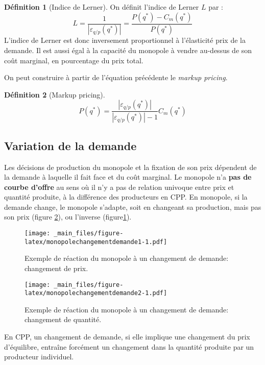 \documentclass[
  a4paper,
]{book}
\theoremstyle{definition}
\newtheorem{definition}{Définition}[chapter]
\theoremstyle{definition}
\theoremstyle{definition}
\theoremstyle{definition}
\theoremstyle{remark}
\begin{document}
\begin{definition}[Indice de Lerner]
\protect\hypertarget{def:Lerner}{}\label{def:Lerner}On définit l'indice de Lerner \(L\) par :
\[
L=\frac{1}{|\varepsilon_{q/p}(q^*)|} = \frac{P(q^*) - C_m(q^*)}{P(q^*)} \label{eq:Lerner}
\]
L'indice de Lerner est donc inversement proportionnel à l'élasticité prix de la demande.
Il est aussi égal à la capacité du monopole à vendre au-dessus de son coût marginal, en pourcentage du prix total.
\end{definition}

On peut construire à partir de l'équation précédente le \emph{markup pricing}.

\begin{definition}[Markup pricing]
\[
P(q^*) =\frac{|\varepsilon_{q/p}(q^*)|}{|\varepsilon_{q/p}(q^*)|-1} C_m(q^*)
\]
\end{definition}

\hypertarget{variation-de-la-demande}{%
\subsection{Variation de la demande}\label{variation-de-la-demande}}

Les décisions de production du monopole et la fixation de son prix dépendent de la demande à laquelle il fait face et du coût marginal.
Le monopole n'a \textbf{pas de courbe d'offre} au sens où il n'y a pas de relation univoque entre prix et quantité produite, à la différence des producteurs en CPP.
En monopole, si la demande change, le monopole s'adapte, soit en changeant sa production, mais pas son prix (figure \ref{fig:monopolechangementdemande2}), ou l'inverse (figure\ref{fig:monopolechangementdemande1}).

\begin{figure}
\centering
\texttt{[image: \_main\_files/figure-latex/monopolechangementdemande1-1.pdf]}
\caption{\label{fig:monopolechangementdemande1}Exemple de réaction du monopole à un changement de demande: changement de prix.}
\end{figure}

\begin{figure}
\centering
\texttt{[image: \_main\_files/figure-latex/monopolechangementdemande2-1.pdf]}
\caption{\label{fig:monopolechangementdemande2}Exemple de réaction du monopole à un changement de demande: changement de quantité.}
\end{figure}

En CPP, un changement de demande, si elle implique une changement du prix d'équilibre, entraîne forcément un changement dans la quantité produite par un producteur individuel.
\end{document}
